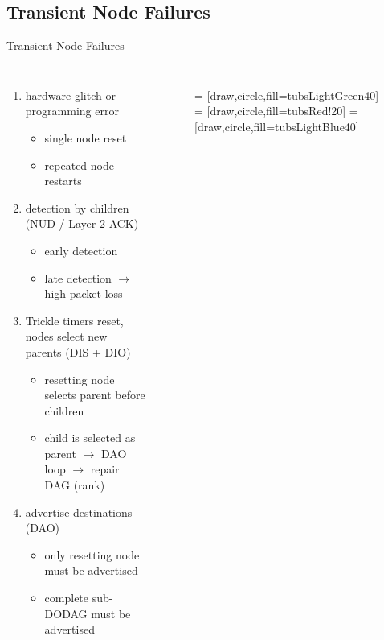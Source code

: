 \documentclass[fleqn,11pt,aspectratio=1610]{beamer}
\begin{document}
\subsection{Transient Node Failures}
\begin{frame}{Transient Node Failures}
  \begin{columns}
    \begin{enumerate}
    \item <2-> hardware glitch or programming error
      \begin{itemize}
      \item \textcolor{tubsDarkGreen}{single node reset}
      \item \textcolor{tubsRed}{repeated node restarts}
      \end{itemize}
    \item <3-> detection by children (NUD / Layer 2 ACK)
      \begin{itemize}
      \item \textcolor{tubsDarkGreen}{early detection}
      \item \textcolor{tubsRed}{late detection $\rightarrow$ high packet loss}
      \end{itemize}
    \item <4-> Trickle timers reset, nodes select new parents (DIS + DIO)
      \begin{itemize}
      \item \textcolor{tubsDarkGreen}{resetting node selects parent before children}
      \item \textcolor{tubsRed}{child is selected as parent $\rightarrow$
          DAO loop $\rightarrow$ repair DAG (rank)}
      \end{itemize}
    \item <5-> advertise destinations (DAO)
      \begin{itemize}
        \item \textcolor{tubsDarkGreen}{only resetting node must be advertised}
        \item \textcolor{tubsRed}{complete sub-DODAG must be advertised}
        \end{itemize}
    \end{enumerate}

    \begin{figure}

       = [draw,circle,fill=tubsLightGreen40]
       = [draw,circle,fill=tubsRed!20]
       = [draw,circle,fill=tubsLightBlue40]


\end{figure}
\end{columns}
\end{frame}
\end{document}
